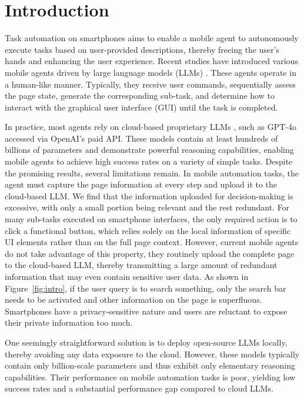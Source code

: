 \section{Introduction}
Task automation on smartphones aims to enable a mobile agent to autonomously execute tasks based on user-provided descriptions, thereby freeing the user's hands and enhancing the user experience. Recent studies have introduced various mobile agents driven by large language models (LLMs) \citep{wang2023enabling, wen2024autodroid, wang2024mobile, wang2025mobile, DBLP:conf/chi/ZhangYLLHCHF025, lee2024mobilegpt}. These agents operate in a human-like manner. Typically, they receive user commands, sequentially assess the page state, generate the corresponding sub-task, and determine how to interact with the graphical user interface (GUI) until the task is completed. 

In practice, most agents rely on cloud-based proprietary LLMs \citep{wang2023enabling, wen2024autodroid, lee2024mobilegpt}, such as GPT-4o accessed via OpenAI’s paid API. These models contain at least hundreds of billions of parameters and demonstrate powerful reasoning capabilities, enabling mobile agents to achieve high success rates on a variety of simple tasks. Despite the promising results, several limitations remain. In mobile automation tasks, the agent must capture the page information at every step and upload it to the cloud-based LLM. We find that the information uploaded for decision-making is excessive, with only a small portion being relevant and the rest redundant. For many sub-tasks executed on smartphone interfaces, the only required action is to click a functional button, which relies solely on the local information of specific UI elements rather than on the full page context. However, current mobile agents do not take advantage of this property, they routinely upload the complete page to the cloud-based LLM, thereby transmitting a large amount of redundant information that may even contain sensitive user data. As shown in Figure~\ref{fig:intro}, if the user query is to search something, only the search bar needs to be activated and other information on the page is superfluous. Smartphones have a privacy-sensitive nature and users are reluctant to expose their private information too much. 

One seemingly straightforward solution is to deploy open‑source LLMs locally, thereby avoiding any data exposure to the cloud. However, these models typically contain only billion-scale parameters and thus exhibit only elementary reasoning capabilities. Their performance on mobile automation tasks is poor, yielding low success rates and a substantial performance gap compared to cloud LLMs. 

